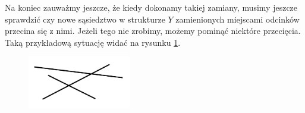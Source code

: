 Na koniec zauważmy jeszcze, że kiedy dokonamy takiej zamiany, musimy 
jeszcze sprawdzić czy nowe sąsiedztwo w strukturze $Y$ zamienionych miejscami 
odcinków przecina się z nimi. Jeżeli tego nie zrobimy, możemy pominąć niektóre przecięcia.
Taką przykładową sytuację widać na rysunku \ref{fig:zamiatanie_kontrprzyklad_wariant2}.

\begin{figure}[H]
	\centering
	\includegraphics[width=0.4\textwidth]{data/zamiatanie_wariant2_kontrprzyklad.png}
	\caption{ %
	 }
	\label{fig:zamiatanie_kontrprzyklad_wariant2}
\end{figure}

